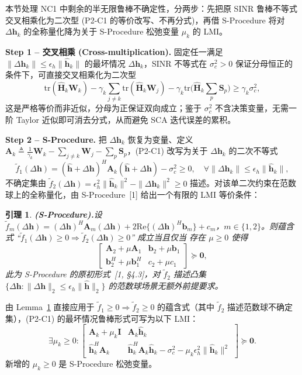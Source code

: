 \documentclass[12pt,a4paper]{article}
\newtheorem{lemma}{引理}
\newcommand{\vect}[1]{\mathbf{#1}}
\newcommand{\mat}[1]{\mathbf{#1}}
\newcommand{\tr}{\text{tr}}
\newcommand{\Real}{\text{Re}}
\begin{document}
本节处理 NC1 中剩余的半无限鲁棒不确定性，分两步：先把原 SINR 鲁棒不等式交叉相乘化为二次型 (P2-C1 的等价改写、不再分式)，再借 S-Procedure 将对 $\Delta\vect{h}_k$ 的全称量化降为关于 S-Procedure 松弛变量 $\mu_k$ 的 LMI。

\textbf{Step 1 -- 交叉相乘 (Cross-multiplication).} 固定任一满足 $\|\Delta\vect{h}_k\| \leq \epsilon_h \|\hat{\vect{h}}_k\|$ 的最坏情况 $\Delta\vect{h}_k$，SINR 不等式在 $\sigma_c^2 > 0$ 保证分母恒正的条件下，可直接交叉相乘化为二次型
\begin{equation}
\tr(\hat{\mat{H}}_k \mat{W}_k) - \gamma_k \sum_{j \neq k} \tr(\hat{\mat{H}}_k \mat{W}_j) - \gamma_k \tr\Big(\hat{\mat{H}}_k \sum_p \mat{S}_p\Big) \geq \gamma_k \sigma_c^2, \tag{S2.1}
\end{equation}
这是严格等价而非近似，分母为正保证双向成立；鉴于 $\sigma_c^2$ 不含决策变量，无需一阶 Taylor 近似即可消去分式，从而避免 SCA 迭代误差的累积。

\textbf{Step 2 -- S-Procedure.} 把 $\Delta\vect{h}_k$ 恢复为变量、定义 $\mat{A}_k \triangleq \frac{1}{\gamma_k} \mat{W}_k - \sum_{j \neq k} \mat{W}_j - \sum_{p} \mat{S}_p$，(P2-C1) 改写为关于 $\Delta\vect{h}_k$ 的二次不等式
\[
\tilde{f}_1(\Delta\vect{h}) = (\hat{\vect{h}} + \Delta\vect{h})^H \mat{A}_k (\hat{\vect{h}} + \Delta\vect{h}) - \sigma_c^2 \geq 0, \quad \forall \|\Delta\vect{h}_k\| \leq \epsilon_h \|\hat{\vect{h}}_k\|,
\]
不确定集由 $\tilde{f}_2(\Delta\vect{h}) = \epsilon_h^2 \|\hat{\vect{h}}_k\|^2 - \|\Delta\vect{h}_k\|^2 \geq 0$ 描述。对该单二次约束在范数球上的全称量化，由 S-Procedure~[1] 给出一个有限的 LMI 等价条件：

\begin{lemma}\textbf{(S-Procedure).}\label{lem:s-procedure}
设 $\tilde{f}_m(\Delta\vect{h}) = (\Delta\vect{h})^H \mat{A}_m (\Delta\vect{h}) + 2\Real\{(\Delta\vect{h})^H \vect{b}_m\} + c_m$，$m \in \{1, 2\}$。则蕴含式 ``$\tilde{f}_1(\Delta\vect{h}) \geq 0 \Rightarrow \tilde{f}_2(\Delta\vect{h}) \geq 0$'' \emph{成立当且仅当} 存在 $\mu \geq 0$ 使得
\[
\begin{bmatrix} \mat{A}_2 + \mu \mat{A}_1 & \vect{b}_2 + \mu \vect{b}_1 \\ \vect{b}_2^H + \mu \vect{b}_1^H & c_2 + \mu c_1 \end{bmatrix} \succeq \mat{0},
\]
此为 S-Procedure 的原初形式~[1, \S4.3]，对 $\tilde{f}_2$ 描述凸集 $\{ \Delta\vect{h} : \|\Delta\vect{h}\|_2 \leq \epsilon_h \|\hat{\vect{h}}\|_2 \}$ 的范数球场景无额外前提要求。
\end{lemma}

由 Lemma~\ref{lem:s-procedure} 直接应用于 $\tilde{f}_1 \geq 0 \Rightarrow \tilde{f}_2 \geq 0$ 的蕴含式（其中 $\tilde{f}_2$ 描述范数球不确定集），(P2-C1) 的最坏情况鲁棒形式可写为以下 LMI：
\begin{equation}
\exists \mu_k \geq 0: \begin{bmatrix} \mat{A}_k + \mu_k \mat{I} & \mat{A}_k \hat{\vect{h}}_k \\[1.2ex] \hat{\vect{h}}_k^H \mat{A}_k & \hat{\vect{h}}_k^H \mat{A}_k \hat{\vect{h}}_k - \sigma_c^2 - \mu_k \epsilon_h^2 \|\hat{\vect{h}}_k\|^2 \end{bmatrix} \succeq \mat{0}. \tag{S3.1}
\end{equation}
新增的 $\mu_k \geq 0$ 是 S-Procedure 松弛变量。
\end{document}
